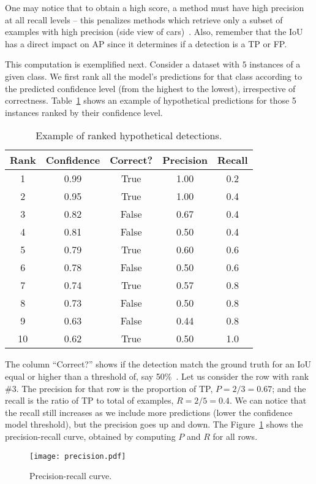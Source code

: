 One may notice that to obtain a high score, a method must have high precision at all recall levels -- this penalizes methods which retrieve only a subset of examples with high precision (\eg side view of cars)~\cite{Everingham10}.
Also, remember that the IoU has a direct impact on AP since it determines if a detection is a TP or FP.

This computation is exemplified next.
Consider a dataset with $5$ instances of a given class.
We first rank all the model's predictions for that class according to the predicted confidence level (from the highest to the lowest), irrespective of correctness.
Table~\ref{tab:ex_rank_detections} shows an example of hypothetical predictions for those 5 instances ranked by their confidence level.
%
\begin{table}[th]
\centering
\begin{tabular}{ccccc}
\toprule
Rank &  Confidence &  Correct? &  Precision &  Recall \\
\midrule
1 &    0.99 &      True &   1.00 &     0.2 \\
2 &    0.95 &      True &   1.00 &     0.4 \\
3 &    0.82 &     False &   0.67 &     0.4 \\
4 &    0.81 &     False &   0.50 &     0.4 \\
5 &    0.79 &      True &   0.60 &     0.6 \\
6 &    0.78 &     False &   0.50 &     0.6 \\
7 &    0.74 &      True &   0.57 &     0.8 \\
8 &    0.73 &     False &   0.50 &     0.8 \\
9 &    0.63 &     False &   0.44 &     0.8 \\
10 &   0.62 &      True &   0.50 &     1.0 \\
\bottomrule
\end{tabular}
\caption{Example of ranked hypothetical detections.}
\label{tab:ex_rank_detections}
\end{table}
%
The column ``Correct?'' shows if the detection match the ground truth for an IoU equal or higher than a threshold of, say 50\%~\cite{Everingham10}.
%
Let us consider the row with rank \#3.
The precision for that row is the proportion of TP, $P=2/3=0.67$;
and the recall is the ratio of TP to total of examples, $R = 2/5 = 0.4$.
We can notice that the recall still increases as we include more predictions (lower the confidence model threshold), but the precision goes up and down.
The Figure~\ref{fig:prec-rec_curve} shows the precision-recall curve, obtained by computing $P$ and $R$ for all rows.
%
\begin{figure}[th]
	\centering
	\texttt{[image: precision.pdf]}
	\caption{Precision-recall curve.}
	\label{fig:prec-rec_curve}
\end{figure}


